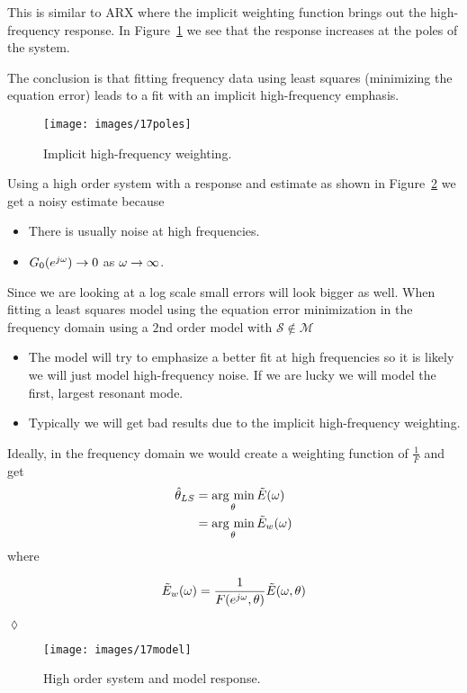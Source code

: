 This is similar to ARX where the implicit weighting function brings out the high-frequency response.
In Figure~\ref{fig:17poles} we see that the response increases at the poles of the system.

The conclusion is that fitting frequency data using least squares (minimizing the equation error) leads to a fit with an implicit high-frequency emphasis.

\begin{figure}[ht!]
\centering
\texttt{[image: images/17poles]}
\caption{Implicit high-frequency weighting.}%
\label{fig:17poles}
\end{figure}

\begin{example}
Using a high order system with a response and estimate as shown in Figure~\ref{fig:17model} we get a noisy estimate because
\begin{itemize}
\item There is usually noise at high frequencies.
\item $G_0(e^{j\omega})\to0$ as $\omega\to\infty$.
\end{itemize}
Since we are looking at a log scale small errors will look bigger as well.
When fitting a least squares model using the equation error minimization in the frequency domain using a $2$nd order model with $\mathcal{S}\notin\mathcal{M}$
\begin{itemize}
\item The model will try to emphasize a better fit at high frequencies so it is likely we will just model high-frequency noise.
If we are lucky we will model the first, largest resonant mode.
\item Typically we will get bad results due to the implicit high-frequency weighting.
\end{itemize}
Ideally, in the frequency domain we would create a weighting function of $\tfrac{1}{F}$ and get
\begin{align*}
\hat{\theta}_{LS} &= \mathop{\arg\,\min}\limits_\theta\tilde{E}(\omega) \\
&= \mathop{\arg\,\min}\limits_\theta\tilde{E}_w(\omega)
\end{align*}
where

  \begin{equation*}
\tilde{E}_w(\omega) = \frac{1}{F(e^{j\omega},\theta)}\tilde{E}(\omega,\theta)
  \end{equation*}

  $\lozenge$
\end{example}

\begin{figure}[ht!]
\centering
\texttt{[image: images/17model]}
\caption{High order system and model response.}%
\label{fig:17model}
\end{figure}

